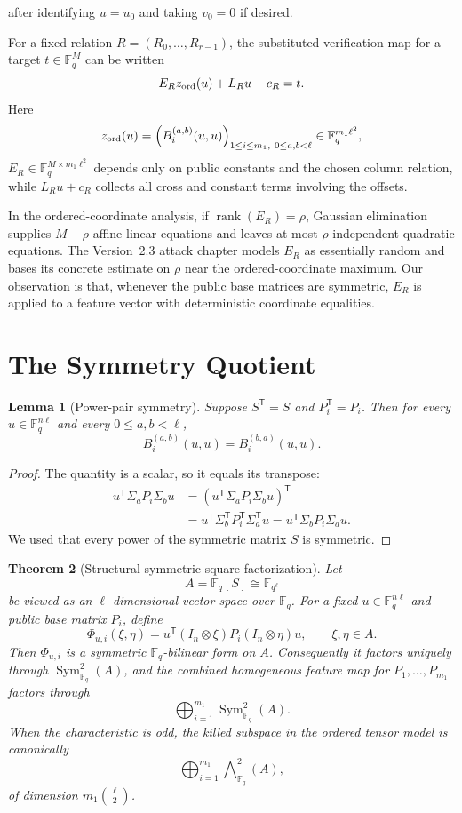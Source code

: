 \documentclass[11pt]{article}
\newtheorem{theorem}{Theorem}
\newtheorem{lemma}[theorem]{Lemma}
\newcommand{\F}{\mathbb F}
\newcommand{\Sym}{\operatorname{Sym}}
\newcommand{\rank}{\operatorname{rank}}
\newcommand{\transpose}{\mathsf T}
\begin{document}
after identifying $u=u_0$ and taking $v_0=0$ if desired.

For a fixed relation $R=(R_0,\ldots,R_{r-1})$, the substituted verification map for a target $t\in\F_q^M$ can be written
\begin{equation}\label{eq:affine-system}
 E_R z_{\rm ord}(u)+L_Ru+c_R=t.
\end{equation}
Here
\[
 z_{\rm ord}(u)
 =\left(B_i^{(a,b)}(u,u)\right)_{1\le i\le m_1,\ 0\le a,b<\ell}
 \in\F_q^{m_1\ell^2},
\]
$E_R\in\F_q^{M\times m_1\ell^2}$ depends only on public constants and the chosen column relation, while $L_Ru+c_R$ collects all cross and constant terms involving the offsets.

In the ordered-coordinate analysis, if $\rank(E_R)=\rho$, Gaussian elimination supplies $M-\rho$ affine-linear equations and leaves at most $\rho$ independent quadratic equations.  The Version~2.3 attack chapter models $E_R$ as essentially random and bases its concrete estimate on $\rho$ near the ordered-coordinate maximum.  Our observation is that, whenever the public base matrices are symmetric, $E_R$ is applied to a feature vector with deterministic coordinate equalities.

\section{The Symmetry Quotient}\label{sec:symmetry}

\begin{lemma}[Power-pair symmetry]\label{lem:powerpair}
Suppose $S^\transpose=S$ and $P_i^\transpose=P_i$.  Then for every $u\in\F_q^{n\ell}$ and every $0\le a,b<\ell$,
\[
 B_i^{(a,b)}(u,u)=B_i^{(b,a)}(u,u).
\]
\end{lemma}

\begin{proof}
The quantity is a scalar, so it equals its transpose:
\[
 \begin{aligned}
 u^\transpose\Sigma_aP_i\Sigma_bu
 &=\left(u^\transpose\Sigma_aP_i\Sigma_bu\right)^\transpose\\
 &=u^\transpose\Sigma_b^\transpose P_i^\transpose\Sigma_a^\transpose u
 =u^\transpose\Sigma_bP_i\Sigma_au.
 \end{aligned}
\]
We used that every power of the symmetric matrix $S$ is symmetric.
\end{proof}

\begin{theorem}[Structural symmetric-square factorization]\label{thm:structural-sym2}
Let
\[
 A=\F_q[S]\cong \F_{q^\ell}
\]
be viewed as an $\ell$-dimensional vector space over $\F_q$.  For a fixed
$u\in\F_q^{n\ell}$ and public base matrix $P_i$, define
\[
 \Phi_{u,i}(\xi,\eta)
 =u^\transpose(I_n\otimes\xi)P_i(I_n\otimes\eta)u,
 \qquad \xi,\eta\in A.
\]
Then $\Phi_{u,i}$ is a symmetric $\F_q$-bilinear form on $A$.  Consequently
it factors uniquely through $\Sym^2_{\F_q}(A)$, and the combined homogeneous
feature map for $P_1,\ldots,P_{m_1}$ factors through
\[
 \bigoplus_{i=1}^{m_1}\Sym^2_{\F_q}(A).
\]
When the characteristic is odd, the killed subspace in the ordered tensor
model is canonically
\[
 \bigoplus_{i=1}^{m_1}\bigwedge\nolimits^2_{\F_q}(A),
\]
of dimension $m_1\binom{\ell}{2}$.
\end{theorem}
\end{document}
